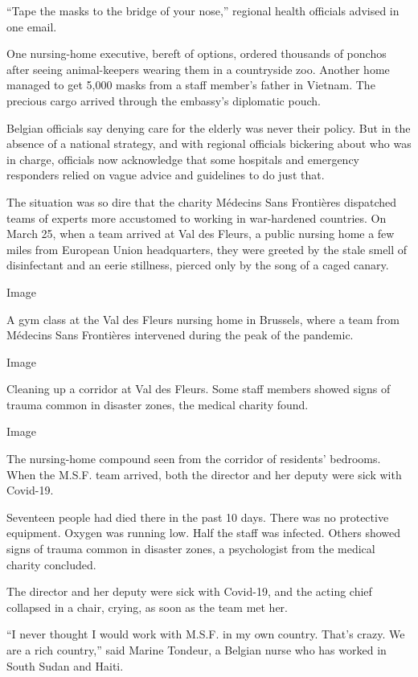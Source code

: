 ``Tape the masks to the bridge of your nose,'' regional health officials
advised in one email.

One nursing-home executive, bereft of options, ordered thousands of
ponchos after seeing animal-keepers wearing them in a countryside zoo.
Another home managed to get 5,000 masks from a staff member's father in
Vietnam. The precious cargo arrived through the embassy's diplomatic
pouch.

Belgian officials say denying care for the elderly was never their
policy. But in the absence of a national strategy, and with regional
officials bickering about who was in charge, officials now acknowledge
that some hospitals and emergency responders relied on vague advice and
guidelines to do just that.

The situation was so dire that the charity Médecins Sans Frontières
dispatched teams of experts more accustomed to working in war-hardened
countries. On March 25, when a team arrived at Val des Fleurs, a public
nursing home a few miles from European Union headquarters, they were
greeted by the stale smell of disinfectant and an eerie stillness,
pierced only by the song of a caged canary.

Image

A gym class at the Val des Fleurs nursing home in Brussels, where a team
from Médecins Sans Frontières intervened during the peak of the
pandemic.

Image

Cleaning up a corridor at Val des Fleurs. Some staff members showed
signs of trauma common in disaster zones, the medical charity found.

Image

The nursing-home compound seen from the corridor of residents' bedrooms.
When the M.S.F. team arrived, both the director and her deputy were sick
with Covid-19.

Seventeen people had died there in the past 10 days. There was no
protective equipment. Oxygen was running low. Half the staff was
infected. Others showed signs of trauma common in disaster zones, a
psychologist from the medical charity concluded.

The director and her deputy were sick with Covid-19, and the acting
chief collapsed in a chair, crying, as soon as the team met her.

``I never thought I would work with M.S.F. in my own country. That's
crazy. We are a rich country,'' said Marine Tondeur, a Belgian nurse who
has worked in South Sudan and Haiti.

